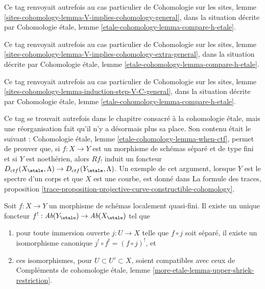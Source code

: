 \begin{remark}
\label{remark-V-implies-cohomology-etale-h}
Ce tag renvoyait autrefois au cas particulier de
Cohomologie sur les sites, lemme
\ref{sites-cohomology-lemma-V-implies-cohomology-general}, dans la situation
décrite par Cohomologie étale, lemme
\ref{etale-cohomology-lemma-compare-h-etale}.
\end{remark}

\begin{remark}
\label{remark-V-implies-cohomology-etale-h-extra}
Ce tag renvoyait autrefois au cas particulier de
Cohomologie sur les sites, lemme
\ref{sites-cohomology-lemma-V-implies-cohomology-extra-general}, dans la
situation décrite par Cohomologie étale, lemme
\ref{etale-cohomology-lemma-compare-h-etale}.
\end{remark}

\begin{remark}
\label{remark-induction-step-V-C-etale-h}
Ce tag renvoyait autrefois au cas particulier de
Cohomologie sur les sites, lemme
\ref{sites-cohomology-lemma-induction-step-V-C-general}, dans la situation
décrite par Cohomologie étale, lemme
\ref{etale-cohomology-lemma-compare-h-etale}.
\end{remark}

\begin{remark}
\label{remark-how-used}
Ce tag se trouvait autrefois dans le chapitre consacré à la cohomologie
étale, mais une réorganisation fait qu'il n'y a désormais plus sa place.
Son contenu était le suivant :
Cohomologie étale, lemme \ref{etale-cohomology-lemma-when-ctf},
permet de prouver que, si $f : X \to Y$ est un morphisme de schémas séparé
et de type fini et si $Y$ est noethérien, alors $Rf_!$ induit un foncteur
$D_{ctf}(X_\etale, \Lambda) \to D_{ctf}(Y_\etale, \Lambda)$.
Un exemple de cet argument, lorsque $Y$ est le spectre d'un corps et que
$X$ est une courbe, est donné dans La formule des traces,
proposition \ref{trace-proposition-projective-curve-constructible-cohomology}.
\end{remark}

\begin{lemma}
\label{lemma-glue-f-upper-shriek}
Soit $f : X \to Y$ un morphisme de schémas localement quasi-fini.
Il existe un unique foncteur
$f^! : \textit{Ab}(Y_\etale) \to \textit{Ab}(X_\etale)$ tel que
\begin{enumerate}
\item pour toute immersion ouverte $j : U \to X$ telle que $f \circ j$
soit séparé, il existe un isomorphisme canonique
$j^! \circ f^! = (f \circ j)^!$, et
\item ces isomorphismes, pour $U \subset U' \subset X$, soient compatibles
avec ceux de Compléments de cohomologie étale, lemme
\ref{more-etale-lemma-upper-shriek-restriction}.
\end{enumerate}
\end{lemma}

